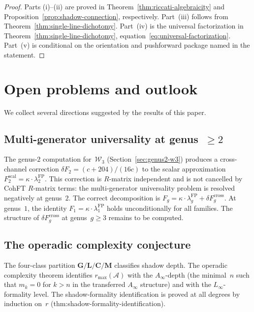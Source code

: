 \documentclass[11pt,reqno]{amsart}
\theoremstyle{definition}
\theoremstyle{remark}
\newcommand{\cA}{\mathcal{A}}
\newcommand{\cW}{\mathcal{W}}
\numberwithin{equation}{section}
\begin{document}
\begin{proof}
Parts (i)--(ii) are proved in Theorem~\ref{thm:riccati-algebraicity}
and Proposition~\ref{prop:shadow-connection}, respectively.
Part~(iii) follows from Theorem~\ref{thm:single-line-dichotomy}.
Part~(iv) is the universal factorization in
Theorem~\ref{thm:single-line-dichotomy}, equation~\eqref{eq:universal-factorization}.
Part~(v) is conditional on the orientation and pushforward package
named in the statement.
\end{proof}





\section{Open problems and outlook}\label{sec:outlook}

We collect several directions suggested by the results of this paper.

\subsection{Multi-generator universality at genus~$\ge 2$}

The genus-$2$ computation for~$\cW_3$
(Section~\ref{sec:genus2-w3}) produces a cross-channel correction
$\delta F_2 = (c+204)/(16c)$ to the scalar approximation
$F_2^{\mathrm{scal}} = \kappa \cdot \lambda_2^{\mathrm{FP}}$.
This correction is $R$-matrix independent and is not cancelled
by CohFT $R$-matrix terms: the multi-generator universality
problem is resolved negatively at genus~$2$.
The correct decomposition is
$F_g = \kappa \cdot \lambda_g^{\mathrm{FP}} +
\delta F_g^{\mathrm{cross}}$.
At genus~$1$, the identity
$F_1 = \kappa \cdot \lambda_1^{\mathrm{FP}}$
holds unconditionally for all families.
The structure of $\delta F_g^{\mathrm{cross}}$ at genus~$g \ge 3$
remains to be computed.

\subsection{The operadic complexity conjecture}

The four-class partition
$\mathbf{G}/\mathbf{L}/\mathbf{C}/\mathbf{M}$ classifies shadow
depth. The operadic complexity theorem identifies
$r_{\max}(\cA)$ with the $A_\infty$-depth (the minimal~$n$ such
that $m_k = 0$ for $k > n$ in the transferred $A_\infty$ structure)
and with the $L_\infty$-formality level. The shadow-formality
identification is proved at all degrees by induction on~$r$
\textup{(thm:shadow-formality-identification)}.
\end{document}
